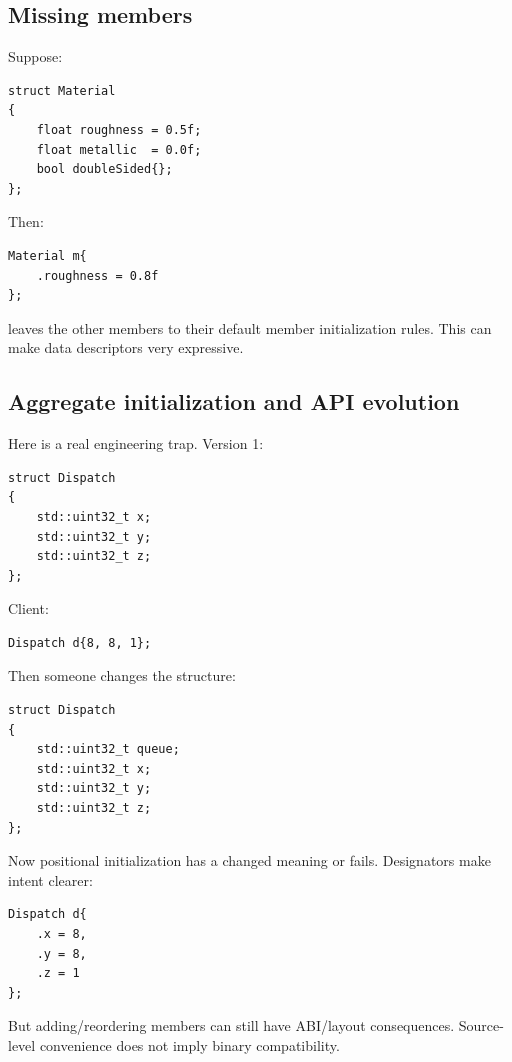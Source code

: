 \subsection{Missing members}\label{01-foundations-i-ch003-missing-members}

Suppose:

\begin{verbatim}
struct Material
{
    float roughness = 0.5f;
    float metallic  = 0.0f;
    bool doubleSided{};
};
\end{verbatim}

Then:

\begin{verbatim}
Material m{
    .roughness = 0.8f
};
\end{verbatim}

leaves the other members to their default member initialization rules. This can make data descriptors very expressive.

\subsection{Aggregate initialization and API evolution}\label{01-foundations-i-ch003-aggregate-initialization-and-api-evolution}

Here is a real engineering trap. Version 1:

\begin{verbatim}
struct Dispatch
{
    std::uint32_t x;
    std::uint32_t y;
    std::uint32_t z;
};
\end{verbatim}

Client:

\begin{verbatim}
Dispatch d{8, 8, 1};
\end{verbatim}

Then someone changes the structure:

\begin{verbatim}
struct Dispatch
{
    std::uint32_t queue;
    std::uint32_t x;
    std::uint32_t y;
    std::uint32_t z;
};
\end{verbatim}

Now positional initialization has a changed meaning or fails. Designators make intent clearer:

\begin{verbatim}
Dispatch d{
    .x = 8,
    .y = 8,
    .z = 1
};
\end{verbatim}

But adding/reordering members can still have ABI/layout consequences. Source-level convenience does not imply binary compatibility.

